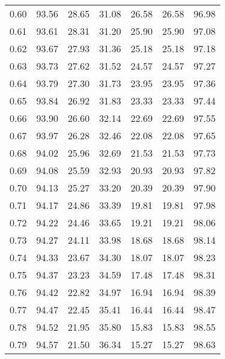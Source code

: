 \begin{tabular}{|c|c|c|c|c|c|c|}
      0.60 &     93.56 &     28.65 &      31.08 &   26.58 &      26.58 &         96.98 \\
      0.61 &     93.61 &     28.31 &      31.20 &   25.90 &      25.90 &         97.08 \\
      0.62 &     93.67 &     27.93 &      31.36 &   25.18 &      25.18 &         97.18 \\
      0.63 &     93.73 &     27.62 &      31.52 &   24.57 &      24.57 &         97.27 \\
      0.64 &     93.79 &     27.30 &      31.73 &   23.95 &      23.95 &         97.36 \\
      0.65 &     93.84 &     26.92 &      31.83 &   23.33 &      23.33 &         97.44 \\
      0.66 &     93.90 &     26.60 &      32.14 &   22.69 &      22.69 &         97.55 \\
      0.67 &     93.97 &     26.28 &      32.46 &   22.08 &      22.08 &         97.65 \\
      0.68 &     94.02 &     25.96 &      32.69 &   21.53 &      21.53 &         97.73 \\
      0.69 &     94.08 &     25.59 &      32.93 &   20.93 &      20.93 &         97.82 \\
      0.70 &     94.13 &     25.27 &      33.20 &   20.39 &      20.39 &         97.90 \\
      0.71 &     94.17 &     24.86 &      33.39 &   19.81 &      19.81 &         97.98 \\
      0.72 &     94.22 &     24.46 &      33.65 &   19.21 &      19.21 &         98.06 \\
      0.73 &     94.27 &     24.11 &      33.98 &   18.68 &      18.68 &         98.14 \\
      0.74 &     94.33 &     23.67 &      34.30 &   18.07 &      18.07 &         98.23 \\
      0.75 &     94.37 &     23.23 &      34.59 &   17.48 &      17.48 &         98.31 \\
      0.76 &     94.42 &     22.82 &      34.97 &   16.94 &      16.94 &         98.39 \\
      0.77 &     94.47 &     22.45 &      35.41 &   16.44 &      16.44 &         98.47 \\
      0.78 &     94.52 &     21.95 &      35.80 &   15.83 &      15.83 &         98.55 \\
      0.79 &     94.57 &     21.50 &      36.34 &   15.27 &      15.27 &         98.63 \\

\end{tabular}
